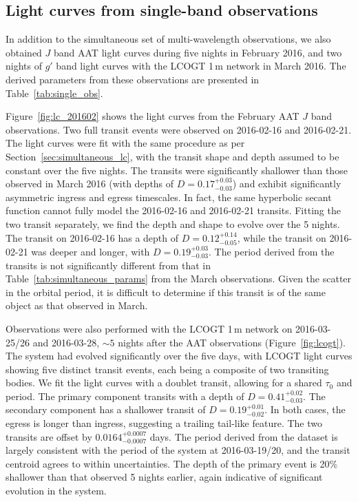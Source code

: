 \documentclass[apj]{emulateapj}
\begin{document}
\subsection{Light curves from single-band observations}
\label{sec:single_band_lc}


In addition to the simultaneous set of multi-wavelength observations, we also obtained $J$ band AAT light curves during five nights in February 2016, and two nights of $g'$ band light curves with the LCOGT 1\,m network in March 2016. The derived parameters from these observations are presented in Table~\ref{tab:single_obs}. 

Figure~\ref{fig:lc_201602} shows the light curves from the February AAT $J$ band observations. Two full transit events were observed on 2016-02-16 and 2016-02-21. The light curves were fit with the same procedure as per Section~\ref{sec:simultaneous_lc}, with the transit shape and depth assumed to be constant over the five nights. The transits were significantly shallower than those observed in March 2016 (with depths of $D=0.17_{-0.03}^{+0.03}$) and exhibit significantly asymmetric ingress and egress timescales. In fact, the same hyperbolic secant function cannot fully model the 2016-02-16 and 2016-02-21 transits. Fitting the two transit separately, we find the depth and shape to evolve over the 5 nights. The transit on 2016-02-16 has a depth of $D = 0.12_{-0.05}^{+0.14}$, while the transit on 2016-02-21 was deeper and longer, with $D = 0.19_{-0.03}^{+0.03}$. The period derived from the transits is not significantly different from that in Table~\ref{tab:simultaneous_params} from the March observations. Given the scatter in the orbital period, it is difficult to determine if this transit is of the same object as that observed in March.

Observations were also performed with the LCOGT 1\,m network on 2016-03-25/26 and 2016-03-28, $\sim 5$ nights after the AAT observations (Figure~\ref{fig:lcogt}). The system had evolved significantly over the five days, with LCOGT light curves showing five distinct transit events, each being a composite of two transiting bodies. We fit the light curves with a doublet transit, allowing for a shared $\tau_0$ and period. The primary component transits with a depth of $D = 0.41_{-0.03}^{+0.02}$. The secondary component has a shallower transit of $D = 0.19_{-0.02}^{+0.01}$. In both cases, the egress is longer than ingress, suggesting a trailing tail-like feature. The two transits are offset by $0.0164_{-0.0007}^{+0.0007}$ days. The period derived from the dataset is largely consistent with the period of the system at 2016-03-19/20, and the transit centroid agrees to within uncertainties. The depth of the primary event is 20\% shallower than that observed 5 nights earlier, again indicative of significant evolution in the system. 
\end{document}
